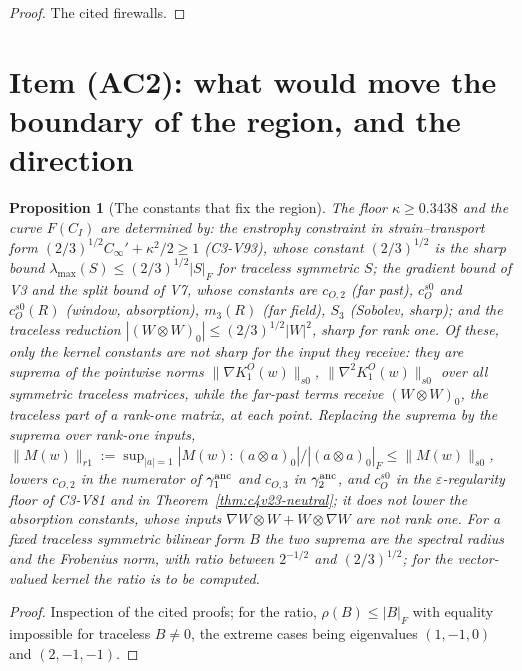 \documentclass[11pt]{article}
\theoremstyle{plain}
\newtheorem{proposition}[theorem]{Proposition}
\theoremstyle{definition}
\theoremstyle{remark}
\begin{document}
\begin{proof}
The cited firewalls.
\end{proof}

\section{Item (AC2): what would move the boundary of the region, and the direction}
\label{sec:c4v24-direction}

\begin{proposition}[The constants that fix the region]
\label{prop:c4v24-constants}
The floor \(\kappa\ge0.3438\) and the curve \(F(C_I)\) are determined by: the enstrophy
constraint in strain--transport form \((2/3)^{1/2}C_\infty'+\kappa^2/2\ge1\) (C3-V93), whose
constant \((2/3)^{1/2}\) is the sharp bound \(\lambda_{\max}(S)\le(2/3)^{1/2}|S|_F\) for traceless symmetric
\(S\); the gradient bound of V3 and the split bound of V7, whose
constants are \(c_{O,2}\) (far past), \(c_O^{s0}\) and \(c_O^{s0}(R)\) (window, absorption),
\(m_3(R)\) (far field), \(S_3\) (Sobolev, sharp); and the traceless reduction
\(|(W\otimes W)_0|\le(2/3)^{1/2}|W|^2\), sharp for rank one.  Of these, only the kernel
constants are not sharp for the input they receive: they are
suprema of the pointwise norms \(\|\nabla K^O_1(w)\|_{s0}\), \(\|\nabla^2K^O_1(w)\|_{s0}\) over all
symmetric traceless matrices, while the far-past terms receive
\((W\otimes W)_0\), the traceless part of a rank-one matrix, at each point.
Replacing the suprema by the suprema over rank-one inputs,
\(\|M(w)\|_{r1}:=\sup_{|a|=1}|M(w):(a\otimes a)_0|/|(a\otimes a)_0|_F\le\|M(w)\|_{s0}\), lowers \(c_{O,2}\) in the numerator of
\(\gamma_1^{\rm anc}\) and \(c_{O,3}\) in \(\gamma_2^{\rm anc}\), and \(c_O^{s0}\) in the \(\varepsilon\)-regularity floor of
C3-V81 and in Theorem~\ref{thm:c4v23-neutral}; it does not lower the
absorption constants, whose inputs \(\nabla W\otimes W+W\otimes\nabla W\) are not rank one.
For a fixed traceless symmetric bilinear form \(B\) the two suprema are
the spectral radius and the Frobenius norm, with ratio between \(2^{-1/2}\)
and \((2/3)^{1/2}\); for the vector-valued kernel the ratio is to be
computed.
\end{proposition}

\begin{proof}
Inspection of the cited proofs; for the ratio, \(\rho(B)\le|B|_F\) with equality
impossible for traceless \(B\ne0\), the extreme cases being eigenvalues
\((1,-1,0)\) and \((2,-1,-1)\).
\end{proof}
\end{document}

